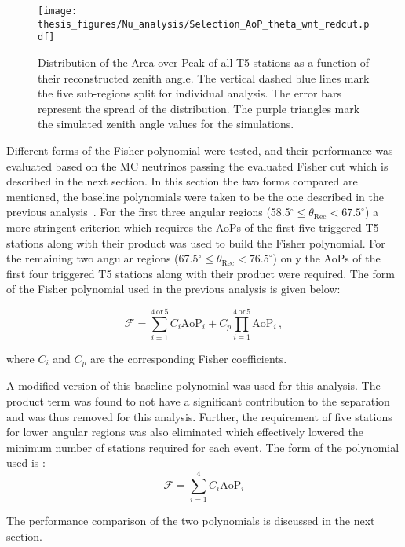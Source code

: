 \begin{figure}[h!]
  \centering
  \texttt{[image: thesis\_figures/Nu\_analysis/Selection\_AoP\_theta\_wnt\_redcut.pdf]}
  \caption{Distribution of the Area over Peak of all T5 stations as a function of their reconstructed zenith angle. The vertical dashed blue lines mark the five sub-regions split for individual analysis. The error bars represent the spread of the distribution. The purple triangles mark the simulated zenith angle values for the simulations.}
  \label{fig:AoP_v_theta}
\end{figure}

Different forms of the Fisher polynomial were tested, and their performance was evaluated based on the MC neutrinos passing the evaluated Fisher cut which is described in the next section. In this section the two forms compared are mentioned, the baseline polynomials were taken to be the one described in the previous analysis~\cite{gap_note_2013}. For the first three angular regions (58.5$^\circ \leq \theta_{\text{Rec}} < 67.5^\circ$) a more stringent criterion which requires the AoPs of the first five triggered T5 stations along with their product was used to build the Fisher polynomial. For the remaining two angular regions (67.5$^\circ \leq \theta_{\text{Rec}} < 76.5^\circ$) only the AoPs of the first four triggered T5 stations along with their product were required. The form of the Fisher polynomial used in the previous analysis is given below:

\begin{equation}
  \mathcal{F} = \sum_{i=1}^{4\,\text{or}\,5} C_i \text{AoP}_i + C_p \prod_{i=1}^{4\,\text{or}\,5} \text{AoP}_i \, ,
\end{equation}

where $C_i$ and $C_p$ are the corresponding Fisher coefficients. 

A modified version of this baseline polynomial was used for this analysis. The product term was found to not have a significant contribution to the separation and was thus removed for this analysis. Further, the requirement of five stations for lower angular regions was also eliminated which effectively lowered the minimum number of stations required for each event. The form of the polynomial used is : 
\begin{equation}
  \label{eq:fisher_poly_new}
  \mathcal{F} = \sum_{i=1}^{4} C_i \text{AoP}_i
\end{equation}

The performance comparison of the two polynomials is discussed in the next section.


